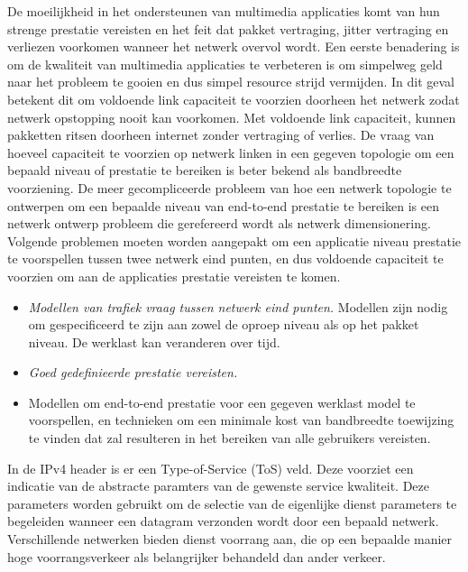 \noindent De moeilijkheid in het ondersteunen van multimedia applicaties komt van hun strenge prestatie vereisten en het feit dat pakket vertraging, jitter vertraging en verliezen voorkomen wanneer het netwerk overvol wordt. Een eerste benadering is om de kwaliteit van multimedia applicaties te verbeteren is om simpelweg geld naar het probleem te gooien en dus simpel resource strijd vermijden. In dit geval betekent dit om voldoende link capaciteit te voorzien doorheen het netwerk zodat netwerk opstopping nooit kan voorkomen. Met voldoende link capaciteit, kunnen pakketten ritsen doorheen internet zonder vertraging of verlies.
De vraag van hoeveel capaciteit te voorzien op netwerk linken in een gegeven topologie om een bepaald niveau of prestatie te bereiken is beter bekend als bandbreedte voorziening. De meer gecompliceerde probleem van hoe een netwerk topologie te ontwerpen om een bepaalde niveau van end-to-end prestatie te bereiken is een netwerk ontwerp probleem die gerefereerd wordt als netwerk dimensionering. Volgende problemen moeten worden aangepakt om een applicatie niveau prestatie te voorspellen tussen twee netwerk eind punten, en dus voldoende capaciteit te voorzien om aan de applicaties prestatie vereisten te komen.
\begin{itemize}

\item	\textit{Modellen van trafiek vraag tussen netwerk eind punten.} Modellen zijn nodig om gespecificeerd te zijn aan zowel de oproep niveau als op het pakket niveau.  De werklast kan veranderen over tijd.
\item	\textit{Goed gedefinieerde prestatie vereisten.}
\item	Modellen om end-to-end prestatie voor een gegeven werklast model te voorspellen, en technieken om een minimale kost van bandbreedte toewijzing te vinden dat zal resulteren in het bereiken van alle gebruikers vereisten.
\end{itemize}

\noindent In de IPv4 header is er een Type-of-Service (ToS) veld. Deze voorziet een indicatie van de abstracte paramters van de gewenste service kwaliteit. Deze parameters worden gebruikt om de selectie van de eigenlijke dienst parameters te begeleiden wanneer een datagram verzonden wordt door een bepaald netwerk. Verschillende netwerken bieden dienst voorrang aan, die op een bepaalde manier hoge voorrangsverkeer als belangrijker behandeld dan ander verkeer.



